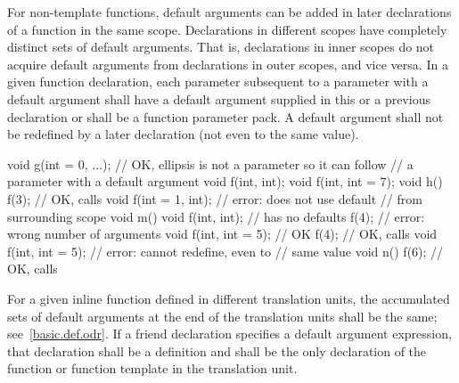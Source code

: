 \pnum
For non-template functions, default arguments can be added in later
declarations of a
function in the same scope.
Declarations in different
scopes have completely distinct sets of default arguments.
That
is, declarations in inner scopes do not acquire default
arguments from declarations in outer scopes, and vice versa.
In
a given function declaration, each parameter subsequent to a
parameter with a default argument shall have a default argument
supplied in this or a previous declaration
or shall be a function parameter pack.
A default argument
shall not be redefined by a later declaration (not even to the
same value).
\begin{example}

\begin{codeblock}
void g(int = 0, ...);           // OK, ellipsis is not a parameter so it can follow
                                // a parameter with a default argument
void f(int, int);
void f(int, int = 7);
void h() {
  f(3);                         // OK, calls 
  void f(int = 1, int);         // error: does not use default
                                // from surrounding scope
}
void m() {
  void f(int, int);             // has no defaults
  f(4);                         // error: wrong number of arguments
  void f(int, int = 5);         // OK
  f(4);                         // OK, calls 
  void f(int, int = 5);         // error: cannot redefine, even to
                                // same value
}
void n() {
  f(6);                         // OK, calls 
}
\end{codeblock}
\end{example}
For a given inline function defined in different translation units,
the accumulated sets of default arguments at the end of the
translation units shall be the same;
see~\ref{basic.def.odr}.
If a friend declaration specifies a default argument expression,
that declaration shall be a definition and shall be the only
declaration of the function or function template in the translation unit.

